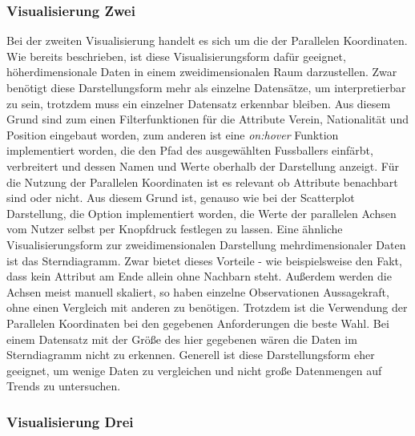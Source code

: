 \documentclass[usegeometry=true]{scrartcl}
\begin{document}
\subsubsection{Visualisierung Zwei}
Bei der zweiten Visualisierung handelt es sich um die der Parallelen Koordinaten. 
Wie bereits beschrieben, ist diese Visualisierungsform dafür geeignet, höherdimensionale Daten in einem zweidimensionalen Raum darzustellen. Zwar benötigt diese Darstellungsform mehr als einzelne Datensätze, um interpretierbar zu sein, trotzdem muss ein einzelner Datensatz erkennbar bleiben. Aus diesem Grund sind zum einen Filterfunktionen für die Attribute Verein, Nationalität und Position eingebaut worden, zum anderen ist eine \textit{on:hover} Funktion implementiert worden, die den Pfad des ausgewählten Fussballers einfärbt, verbreitert und dessen Namen und Werte oberhalb der Darstellung anzeigt.
Für die Nutzung der Parallelen Koordinaten ist es relevant ob Attribute benachbart sind oder nicht. Aus diesem Grund ist, genauso wie bei der Scatterplot Darstellung, die Option implementiert worden, die Werte der parallelen Achsen vom Nutzer selbst per Knopfdruck festlegen zu lassen.
Eine ähnliche Visualisierungsform zur zweidimensionalen Darstellung mehrdimensionaler Daten ist das Sterndiagramm. Zwar bietet dieses Vorteile - wie beispielsweise den Fakt, dass kein Attribut am Ende allein ohne Nachbarn steht. Außerdem werden die Achsen meist manuell skaliert, so haben einzelne Observationen Aussagekraft, ohne einen Vergleich mit anderen zu benötigen. Trotzdem ist die Verwendung der Parallelen Koordinaten bei den gegebenen Anforderungen die beste Wahl. Bei einem Datensatz mit der Größe des hier gegebenen wären die Daten im Sterndiagramm nicht zu erkennen. Generell ist diese Darstellungsform eher geeignet, um wenige Daten zu vergleichen und nicht große Datenmengen auf Trends zu untersuchen. 


\subsubsection{Visualisierung Drei}
\end{document}
